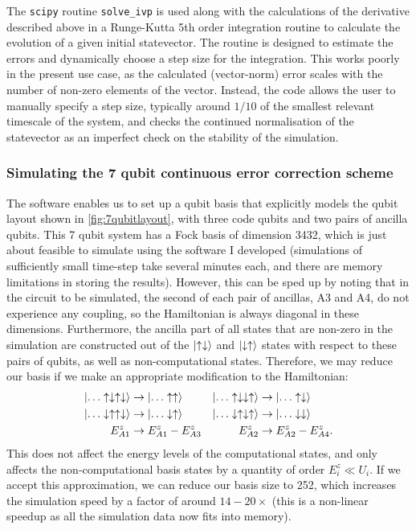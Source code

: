 \documentclass{report}
\begin{document}
\begin{appendices}
The \texttt{scipy} routine \texttt{solve\_ivp} is used along with the calculations of the derivative described above in a Runge-Kutta 5th order \cite{Butcher1996} integration routine to calculate the evolution of a given initial statevector. The routine is designed to estimate the errors and dynamically choose a step size for the integration. This works poorly in the present use case, as the calculated (vector-norm) error scales with the number of non-zero elements of the vector. Instead, the code allows the user to manually specify a step size, typically around $1/10$ of the smallest relevant timescale of the system, and checks the continued normalisation of the statevector as an imperfect check on the stability of the simulation.

\subsubsection{Simulating the 7 qubit continuous error correction scheme} \label{sec:reduced_basis_approx}
The software enables us to set up a qubit basis that explicitly models the qubit layout shown in \ref{fig:7qubitlayout}, with three code qubits and two pairs of ancilla qubits. This 7 qubit system has a Fock basis of dimension 3432, which is just about feasible to simulate using the software I developed (simulations of sufficiently small time-step take several minutes each, and there are memory limitations in storing the results). However, this can be sped up by noting that in the circuit to be simulated, the second of each pair of ancillas, A3 and A4, do not experience any coupling, so the Hamiltonian is always diagonal in these dimensions. Furthermore, the ancilla part of all states that are non-zero in the simulation are constructed out of the $\ket{\uparrow\downarrow}$ and $\ket{\downarrow\uparrow}$ states with respect to these pairs of qubits, as well as non-computational states. Therefore, we may reduce our basis if we make an appropriate modification to the Hamiltonian:
\begin{align*}
    \ket{\dots \uparrow\downarrow\uparrow\downarrow} &\rightarrow \ket{\dots \uparrow\uparrow} &
    \ket{\dots \uparrow\downarrow\downarrow\uparrow} &\rightarrow \ket{\dots \uparrow\downarrow}\\
    \ket{\dots \downarrow\uparrow\uparrow\downarrow} &\rightarrow \ket{\dots \downarrow\uparrow} &
    \ket{\dots \downarrow\uparrow\downarrow\uparrow} &\rightarrow \ket{\dots \downarrow\downarrow}\\
    E_{A1}^z &\rightarrow E_{A1}^z - E_{A3}^z & E_{A2}^z &\rightarrow E_{A2}^z - E_{A4}^z.
\end{align*} This does not affect the energy levels of the computational states, and only affects the non-computational basis states by a quantity of order $E_i^z \ll U_i$. If we accept this approximation, we can reduce our basis size to 252, which increases the simulation speed by a factor of around $14 - 20\times$ (this is a non-linear speedup as all the simulation data now fits into memory).


\end{appendices}
\end{document}
